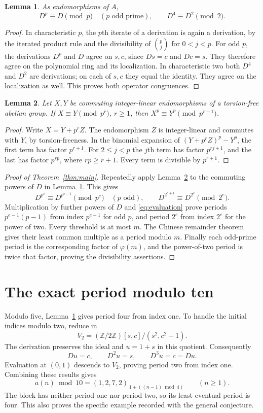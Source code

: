 \documentclass[10pt]{article}
\newtheorem{lemma}{Lemma}
\begin{document}
\begin{lemma}\label{lem:prime}
As endomorphisms of $A$,
\[
 D^p\equiv D\pmod p\quad(p\text{ odd prime}),
 \qquad D^4\equiv D^2\pmod2.
\]
\end{lemma}
\begin{proof}
In characteristic $p$, the $p$th iterate of a derivation is again
a derivation, by the iterated product rule and the divisibility
of $\binom pj$ for $0<j<p$. For odd $p$, the derivations $D^p$
and $D$ agree on $s,c$, since $Ds=c$ and $Dc=s$. They therefore
agree on the polynomial ring and its localization. In
characteristic two both $D^4$ and $D^2$ are derivations; on each
of $s,c$ they equal the identity. They agree on the localization
as well. This proves both operator congruences.
\end{proof}

\begin{lemma}\label{lem:lift}
Let $X,Y$ be commuting integer-linear endomorphisms of a torsion-free
abelian group. If $X\equiv Y\pmod{p^r}$, $r\ge1$, then
$X^p\equiv Y^p\pmod{p^{r+1}}$.
\end{lemma}
\begin{proof}
Write $X=Y+p^rZ$. The endomorphism $Z$ is integer-linear and
commutes with $Y$, by torsion-freeness. In the binomial expansion
of $(Y+p^rZ)^p-Y^p$, the first term has factor $p^{r+1}$.
For $2\le j<p$ the $j$th term has factor $p^{rj+1}$,
and the last has factor $p^{rp}$, where $rp\ge r+1$.
Every term is divisible by $p^{r+1}$.
\end{proof}

\begin{proof}[Proof of Theorem~\ref{thm:main}]
Repeatedly apply Lemma~\ref{lem:lift} to the commuting powers of
$D$ in Lemma~\ref{lem:prime}. This gives
\[
 D^{p^e}\equiv D^{p^{e-1}}\pmod{p^e}\quad(p\text{ odd}),
 \qquad D^{2^{e+1}}\equiv D^{2^e}\pmod{2^e}.
\]
Multiplication by further powers of $D$ and
\eqref{eq:evaluation} prove periods $p^{e-1}(p-1)$ from
index $p^{e-1}$ for odd $p$, and period $2^e$ from index
$2^e$ for the power of two. Every threshold is at most $m$.
The Chinese remainder theorem gives their least common multiple
as a period modulo $m$. Finally each odd-prime period is the
corresponding factor of $\varphi(m)$, and the power-of-two period
is twice that factor, proving the divisibility assertions.
\end{proof}

\section{The exact period modulo ten}
Modulo five, Lemma~\ref{lem:prime} gives period four from index
one. To handle the initial indices modulo two, reduce in
\[
 V_2=(\mathbb Z/2\mathbb Z)[s,c]/(s^2,c^2-1).
\]
The derivation preserves the ideal and $u=1+s$ in this quotient.
Consequently
\[
 Du=c,\qquad D^2u=s,\qquad D^3u=c=Du.
\]
Evaluation at $(0,1)$ descends to $V_2$, proving period two from
index one. Combining these results gives
\[
 a(n)\bmod10=(1,2,7,2)_{\,1+((n-1)\bmod4)}\qquad(n\ge1).
\]
The block has neither period one nor period two, so its least
eventual period is four. This also proves the specific example
recorded with the general conjecture.
\end{document}
